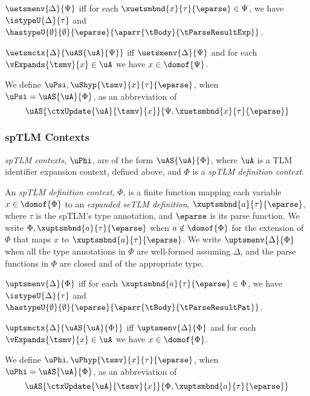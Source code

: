 \begin{definition}\label{def:seTLM-def-ctx-formation} $\uetsmenv{\Delta}{\Psi}$ iff for each $\xuetsmbnd{x}{\tau}{\eparse} \in \Psi$, we have $\istypeU{\Delta}{\tau}$ and $\hastypeU{\emptyset}{\emptyset}{\eparse}{\aparr{\tBody}{\tParseResultExp}}$.\end{definition}

\begin{definition} $\uetsmctx{\Delta}{\uAS{\uA}{\Psi}}$ iff $\uetsmenv{\Delta}{\Psi}$ and for each $\vExpands{\tsmv}{x} \in \uA$ we have $x \in \domof{\Psi}$.
\end{definition}

We define $\uPsi, \uShyp{\tsmv}{x}{\tau}{\eparse}$, when $\uPsi=\uAS{\uA}{\Phi}$, as an abbreviation of \[\uAS{\ctxUpdate{\uA}{\tsmv}{x}}{\Psi, \xuetsmbnd{x}{\tau}{\eparse}}\]

\begin{grayparbox}\vspace{-15px}\subsubsection{spTLM Contexts}
\emph{spTLM contexts}, $\uPhi$, are of the form $\uAS{\uA}{\Phi}$, where $\uA$ is a {TLM identifier expansion context}, defined above, and $\Phi$ is a \emph{spTLM definition context}. 

An \emph{spTLM definition context}, $\Phi$, is a finite function mapping each variable $x \in \domof{\Phi}$ to an \emph{expanded seTLM definition}, $\xuptsmbnd{a}{\tau}{\eparse}$, where $\tau$ is the spTLM's type annotation, and $\eparse$ is its parse function. We write $\Phi, \xuptsmbnd{a}{\tau}{\eparse}$ when $a \notin \domof{\Phi}$ for the extension of $\Phi$ that maps $x$ to $\xuptsmbnd{a}{\tau}{\eparse}$. We write $\uptsmenv{\Delta}{\Phi}$  when all the type annotations in $\Phi$ are well-formed assuming $\Delta$, and the parse functions in $\Phi$ are closed and of the appropriate type.

\begin{definition}\label{def:spTLM-def-ctx-formation} $\uptsmenv{\Delta}{\Phi}$ iff for each $\xuptsmbnd{a}{\tau}{\eparse} \in \Phi$, we have $\istypeU{\Delta}{\tau}$ and $\hastypeU{\emptyset}{\emptyset}{\eparse}{\aparr{\tBody}{\tParseResultPat}}$.\end{definition}

\begin{definition} $\uptsmctx{\Delta}{\uAS{\uA}{\Phi}}$ iff $\uptsmenv{\Delta}{\Phi}$ and for each $\vExpands{\tsmv}{x} \in \uA$ we have $x \in \domof{\Phi}$.
\end{definition}

We define $\uPhi, \uPhyp{\tsmv}{x}{\tau}{\eparse}$, when $\uPhi=\uAS{\uA}{\Phi}$, as an abbreviation of \[\uAS{\ctxUpdate{\uA}{\tsmv}{x}}{\Phi, \xuptsmbnd{a}{\tau}{\eparse}}\]
\end{grayparbox}

